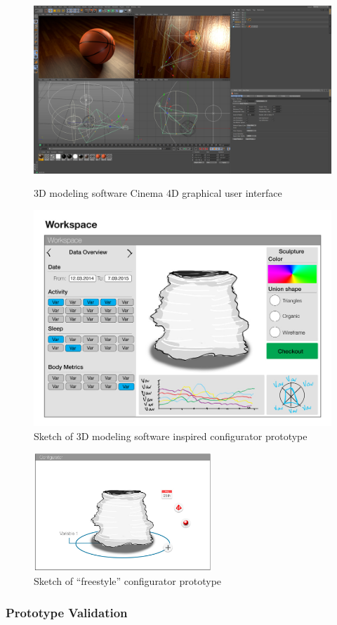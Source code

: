 \documentclass[../medieninformatik-arbeit.tex]{subfiles}
\begin{document}
\begin{figure}[h]
\centering
\begin{minipage}{.45\textwidth}
\centering
  \includegraphics[width=\textwidth]{Prototype/img/cinema4d}
  \caption{3D modeling software Cinema 4D graphical user interface\cite{cinema4d}}
  \label{fig:cinema}
\end{minipage}
\begin{minipage}{.45\textwidth}
\centering
  \includegraphics[width=\linewidth]{Prototype/img/ui_proto2}
  \caption{Sketch of 3D modeling software inspired configurator prototype}
  \label{fig:uiproto2}
\end{minipage}
\end{figure}

\begin{figure}[h]
\captionsetup{width=0.9\textwidth}
\begin{center}
  \includegraphics[width=0.6\textwidth]{Prototype/img/ui_proto3}
  \caption{Sketch of ``freestyle'' configurator prototype}
\label{fig:uiproto3}
\end{center}
\end{figure}

\subsubsection{Prototype Validation}
\end{document}
